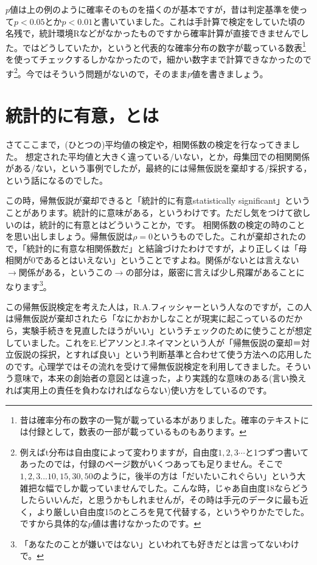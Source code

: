 \documentclass{ltjsarticle}
\begin{document}
$p$値は上の例のように確率そのものを描くのが基本ですが，昔は判定基準を使って$p<0.05$とか$p<0.01$と書いていました。これは手計算で検定をしていた頃の名残で，統計環境Rなどがなかったものですから確率計算が直接できませんでした。ではどうしていたか，というと代表的な確率分布の数字が載っている数表\footnote{昔は確率分布の数字の一覧が載っている本がありました。確率のテキストには付録として，数表の一部が載っているものもあります。}を使ってチェックするしかなかったので，細かい数字まで計算できなかったのです\footnote{例えばt分布は自由度によって変わりますが，自由度$1,2,3\cdots$と1つずつ書いてあったのでは，付録のページ数がいくつあっても足りません。そこで$1,2,3...10,15,30,50$のように，後半の方は「だいたいこれぐらい」という大雑把な幅でしか載っていませんでした。こんな時，じゃあ自由度18ならどうしたらいいんだ，と思うかもしれませんが，その時は手元のデータに最も近く，より厳しい自由度15のところを見て代替する，というやりかたでした。ですから具体的な$p$値は書けなかったのです。}。今ではそういう問題がないので，そのまま$p$値を書きましょう。

\section{統計的に有意，とは}
\label{sec::18_04}
さてここまで，(ひとつの)平均値の検定や，相関係数の検定を行なってきました。
想定された平均値と大きく違っている/いない，とか，母集団での相関関係がある/ない，という事例でしたが，最終的には帰無仮説を棄却する/採択する，という話になるのでした。

この時，帰無仮説が棄却できると「統計的に有意statistically significant」ということがあります。統計的に意味がある，というわけです。ただし気をつけて欲しいのは，統計的に有意とはどういうことか，です。
相関係数の検定の時のことを思い出しましょう。帰無仮説は$\rho=0$というものでした。これが棄却されたので，「統計的に有意な相関係数だ」と結論づけたわけですが，より正しくは「母相関が0であるとはいえない」ということですよね。関係がないとは言えない$\to$関係がある，というこの$\to$の部分は，厳密に言えば少し飛躍があることになります\footnote{「あなたのことが嫌いではない」といわれても好きだとは言ってないわけで。}。

この帰無仮説検定を考えた人は，R.A.フィッシャーという人なのですが，この人は帰無仮説が棄却されたら「なにかおかしなことが現実に起こっているのだから，実験手続きを見直したほうがいい」というチェックのために使うことが想定していました。これをE.ピアソンとJ.ネイマンという人が「帰無仮説の棄却＝対立仮説の採択，とすれば良い」という判断基準と合わせて使う方法への応用したのです。心理学ではその流れを受けて帰無仮説検定を利用してきました。そういう意味で，本来の創始者の意図とは違った，より実践的な意味のある(言い換えれば実用上の責任を負わなければならない)使い方をしているのです。
\end{document}
